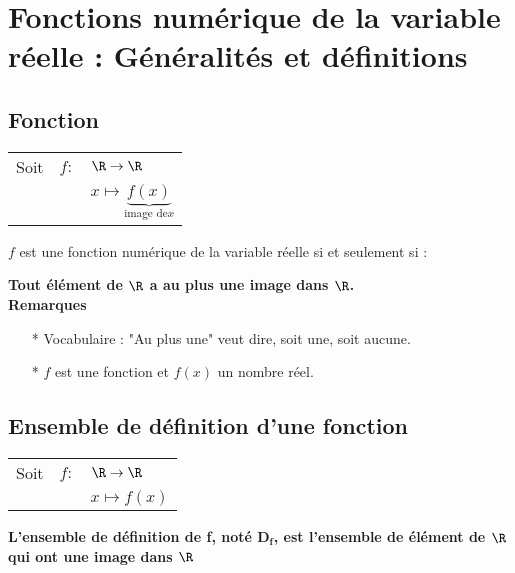 
\section{Fonctions numérique de la variable réelle : Généralités et définitions}

\subsection{Fonction}

\begin{tabular}{lll}
Soit & $f:$ & $ \R \rightarrow \R$ \\
& & $x\mapsto \underbrace{f(x)}_{\textrm{image de} x}$ \\
\end{tabular}

$f$ est une fonction numérique de la variable réelle si et seulement si :

\textbf{Tout élément de $\mathbf{\R}$ a au plus une image dans $\mathbf{\R}$.} \\

\textbf{Remarques}

\begin{itemize}


\item[*]Vocabulaire : "Au plus une" veut dire, soit une, soit aucune. \\ 

\item[*] $f$ est une fonction et $f(x)$ un nombre réel.
\end{itemize}
\subsection{Ensemble de définition d'une fonction}

\begin{tabular}{lll}

Soit & $f:$& $ \R \rightarrow \R$ \\
& & $x\mapsto f(x)$ \\
\end{tabular}

\textbf{L'ensemble de définition de f, noté $ \mathbf{D_f} $, est l'ensemble de élément de $\mathbf{\R}$\\qui ont une image dans $\mathbf{\R}$}


